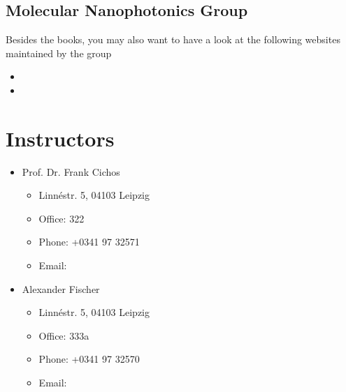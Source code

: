 \documentclass[letterpaper,10pt,english]{sphinxmanual}
\begin{document}
\subsection{Molecular Nanophotonics Group}
\label{\detokenize{course-info/resources:molecular-nanophotonics-group}}
Besides the books, you may also want to have a look at the following websites maintained by the group
\begin{itemize}
\item {} 

\item {} 

\end{itemize}


\section{Instructors}
\label{\detokenize{course-info/instructor:instructors}}\label{\detokenize{course-info/instructor::doc}}\begin{itemize}
\item {} 
Prof. Dr. Frank Cichos
\begin{itemize}
\item {} 
Linnéstr. 5, 04103 Leipzig

\item {} 
Office: 322

\item {} 
Phone: +0341 97 32571

\item {} 
Email: 

\end{itemize}

\end{itemize}

\begin{DUlineblock}{0em}
\item[] 
\end{DUlineblock}
\begin{itemize}
\item {} 
Alexander Fischer
\begin{itemize}
\item {} 
Linnéstr. 5, 04103 Leipzig

\item {} 
Office: 333a

\item {} 
Phone: +0341 97 32570

\item {} 
Email: 

\end{itemize}

\end{itemize}
\end{document}
